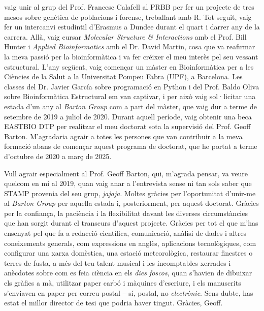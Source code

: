 vaig unir al grup del Prof. Francesc Calafell al PRBB per fer un projecte de tres mesos sobre genètica de poblacions i forense, treballant amb R. Tot seguit, vaig fer un intercanvi estudintil d'Erasmus a Dundee durant el quart i darrer any de la carrera. Allà, vaig cursar \textit{Molecular Structure \& Interactions} amb el Prof. Bill Hunter i \textit{Applied Bioinformatics} amb el Dr. David Martin, cosa que va reafirmar la meva passió per la bioinformàtica i va fer créixer el meu interès pel seu vessant estructural. L'any següent, vaig començar un màster en Bioinformàtica per a les Ciències de la Salut a la Universitat Pompeu Fabra (UPF), a Barcelona. Les classes del Dr. Javier García sobre programació en Python i del Prof. Baldo Oliva sobre Bioinformàtica Estructural em van captivar, i per això vaig sol·licitar una estada d'un any al \textit{Barton Group} com a part del màster, que vaig dur a terme de setembre de 2019 a juliol de 2020. Durant aquell període, vaig obtenir una beca EASTBIO DTP per realitzar el meu doctorat sota la supervisió del Prof. Geoff Barton. M'agradaria agrair a totes les persones que van contribuir a la meva formació abans de començar aquest programa de doctorat, que he portat a terme d'octubre de 2020 a març de 2025.

Vull agrair especialment al Prof. Geoff Barton, qui, m'agrada pensar, va veure quelcom en mi al 2019, quan vaig anar a l'entrevista sense ni tan sols saber que STAMP provenia del seu grup, \textit{jajaja}. Moltes gràcies per l'oportunitat d'unir-me al \textit{Barton Group} per aquella estada i, posteriorment, per aquest doctorat. Gràcies per la confiança, la paciència i la flexibilitat davant les diverses circumstàncies que han sorgit durant el transcurs d'aquest projecte. Gràcies per tot el que m'has ensenyat pel que fa a redacció científica, comunicació, anàlisi de dades i altres coneixements generals, com expressions en anglès, aplicacions tecnològiques, com configurar una xarxa domèstica, una estació meteorològica, restaurar finestres o terres de fusta, a més del teu talent musical i les incomptables xerrades i anècdotes sobre com es feia ciència en els \textit{dies foscos}, quan s'havien de dibuixar els gràfics a mà, utilitzar paper carbó i màquines d'escriure, i els manuscrits s'enviaven en paper per correu postal -- sí, postal, no \textit{electrònic}. Sens dubte, has estat el millor director de tesi que podria haver tingut. Gràcies, Geoff.


